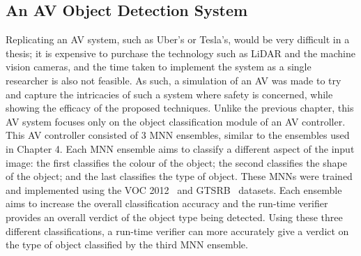 \subsection{An \acf{AV} Object Detection System}
Replicating an \ac{AV} system, such as Uber's or Tesla's, would be very difficult in a thesis; it is expensive to purchase the technology such as \ac{LiDAR} and the machine vision cameras, and the time taken to implement the system as a single researcher is also not feasible.
As such, a simulation of an \ac{AV} was made to try and capture the intricacies of such a system where safety is concerned, while showing the efficacy of the proposed techniques.
Unlike the previous chapter, this \ac{AV} system focuses only on the object classification module of an \ac{AV} controller.
This \ac{AV} controller consisted of 3 \ac{MNN} ensembles, similar to the ensembles used in Chapter 4.
Each \ac{MNN} ensemble aims to classify a different aspect of the input image: the first classifies the colour of the object; the second classifies the shape of the object; and the last classifies the type of object.
These \acp{MNN} were trained and implemented using the \ac{VOC} 2012~\cite{pascal-voc-2012} and \ac{GTSRB}~\cite{Stallkamp2012-gtsrb} datasets.
Each ensemble aims to increase the overall classification accuracy and the run-time verifier provides an overall verdict of the object type being detected.
Using these three different classifications, a run-time verifier can more accurately give a verdict on the type of object classified by the third \ac{MNN} ensemble.

